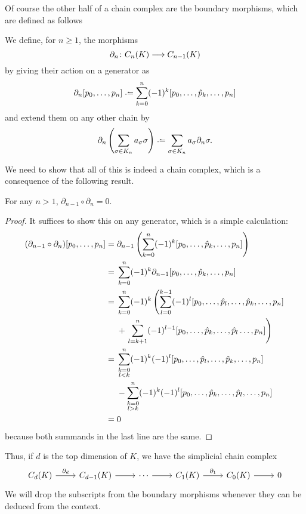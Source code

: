 \documentclass[../main.tex]{subfiles}
\begin{document}
Of course the other half of a chain complex are the boundary morphisms, which are defined
as follows
\begin{definition}
	We define, for \( n \geq 1 \), the morphisms
	\begin{equation*}
		\partial_n \colon C_n(K) \longrightarrow C_{n-1}(K)
	\end{equation*}
	by giving their action on a generator as
	\begin{equation*}
		\partial_n [p_0, \dots, p_n] \defeq \sum_{k = 0}^{n} (-1)^k [p_0, \dots, \hat p_k,
		\dots, p_n]
	\end{equation*}
	and extend them on any other chain by
	\begin{equation*}
		\partial_n\left(\sum_{\sigma \in K_n} a_\sigma \sigma\right) \defeq \sum_{\sigma \in K_n}
		a_\sigma \partial_n \sigma.
	\end{equation*}
\end{definition}
We need to show that all of this is indeed a chain complex, which is a consequence of the
following result.
\begin{lemma}
		For any \( n > 1 \), \( \partial_{n-1} \circ \partial_n = 0 \). 
\end{lemma}
\begin{proof}
	It suffices to show this on any generator, which is a simple calculation:
	\begin{align*}
		(\partial_{n-1} \circ \partial_n)[p_0, \dots, p_n] = {} & \partial_{n-1}\left(\sum_{k
		=		0}^{n}(-1)^k[p_0, \dots, \hat p_k, \dots, p_n]\right) \\
				= {} & \sum_{k = 0}^{n}(-1)^k	\partial_{n-1}[p_0, \dots, \hat	p_k, \dots, p_n] \\
				= {} & \sum_{k = 0}^{n}(-1)^k	\left(\sum_{l = 0}^{k - 1} (-1)^l [p_0, \dots, \hat	p_l, \dots, \hat p_k, \dots, p_n] \right. \\
						 & {} + \left. \sum_{l = k+1}^{n}(-1)^{l-1} [p_0, \dots, \hat p_k, \dots, \hat
						 p_l \dots, p_n]\right) \\
				= {} & \sum_{\mathclap{\substack{k = 0 \\ l < k}}}^n (-1)^k(-1)^l [p_0,	\dots,
				\hat p_l, \dots, \hat p_k, \dots, p_n] \\
						 & {} - \sum_{\mathclap{\substack{k = 0 \\ l > k}}}^n (-1)^k(-1)^l [p_0,
						 \dots, \hat p_k, \dots, \hat p_l, \dots, p_n] \\
				= {} & 0
	\end{align*}
	because both summands in the last line are the same. 
\end{proof}
Thus, if \( d \) is the top dimension of \( K \), we have the
simplicial chain complex
\begin{equation*}
	\begin{tikzcd}
		C_d(K) \arrow[r, "\partial_d"] & C_{d-1}(K) \arrow[r] & \cdots \arrow[r] & C_1(K)
		\arrow[r, "\partial_1"] & C_0(K) \arrow[r] & 0 
	\end{tikzcd}
\end{equation*}
We will drop the subscripts from the boundary morphisms whenever they can be deduced from
the context. 
\end{document}
